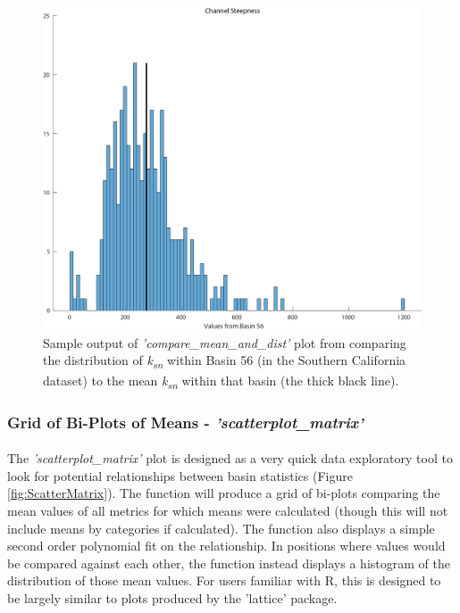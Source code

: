 \begin{figure}[H]
	\centering
	\includegraphics[width=12cm]{PNGs/Basin56_ksn_dist.png}
	\caption{Sample output of \textit{'compare\_mean\_and\_dist'} plot from  comparing the distribution of \textit{k\textsubscript{sn}} within Basin 56 (in the Southern California dataset) to the mean \textit{k\textsubscript{sn}} within that basin (the thick black line).}
	\label{fig:KsnDist}
\end{figure}


\subsubsection{Grid of Bi-Plots of Means - \textit{'scatterplot\_matrix'}} \label{sec:scattermat}
\paragraph{}The \textit{'scatterplot\_matrix'} plot is designed as a very quick data exploratory tool to look for potential relationships between basin statistics (Figure \ref{fig:ScatterMatrix}). The function will produce a grid of bi-plots comparing the mean values of all metrics for which means were calculated (though this will not include means by categories if calculated). The function also displays a simple second order polynomial fit on the relationship. In positions where values would be compared against each other, the function instead displays a histogram of the distribution of those mean values. For users familiar with R, this is designed to be largely similar to plots produced by the 'lattice' package. 

